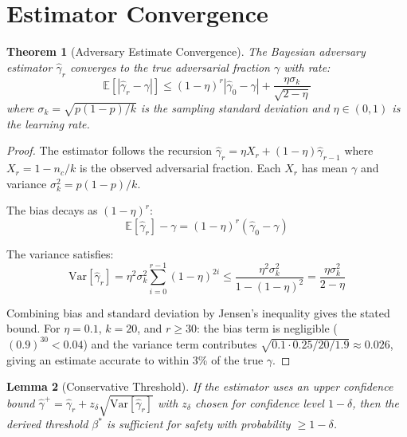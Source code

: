 \documentclass[11pt,a4paper]{article}
\newtheorem{theorem}{Theorem}[section]
\newtheorem{lemma}[theorem]{Lemma}
\begin{document}
\section{Estimator Convergence}
\label{sec:estimator}

\begin{theorem}[Adversary Estimate Convergence]
\label{thm:estimator}
The Bayesian adversary estimator $\hat{\gamma}_r$ converges to the true adversarial
fraction $\gamma$ with rate:
\[
\mathbb{E}[|\hat{\gamma}_r - \gamma|] \leq (1 - \eta)^r |\hat{\gamma}_0 - \gamma| + \frac{\eta \sigma_k}{\sqrt{2 - \eta}}
\]
where $\sigma_k = \sqrt{p(1-p)/k}$ is the sampling standard deviation and $\eta \in (0, 1)$
is the learning rate.
\end{theorem}

\begin{proof}
The estimator follows the recursion $\hat{\gamma}_r = \eta X_r + (1 - \eta)\hat{\gamma}_{r-1}$
where $X_r = 1 - n_c/k$ is the observed adversarial fraction. Each $X_r$ has mean $\gamma$
and variance $\sigma_k^2 = p(1-p)/k$.

The bias decays as $(1-\eta)^r$:
\[
\mathbb{E}[\hat{\gamma}_r] - \gamma = (1-\eta)^r(\hat{\gamma}_0 - \gamma)
\]

The variance satisfies:
\[
\text{Var}[\hat{\gamma}_r] = \eta^2 \sigma_k^2 \sum_{i=0}^{r-1} (1-\eta)^{2i}
\leq \frac{\eta^2 \sigma_k^2}{1 - (1-\eta)^2} = \frac{\eta \sigma_k^2}{2 - \eta}
\]

Combining bias and standard deviation by Jensen's inequality gives the stated bound.
For $\eta = 0.1$, $k = 20$, and $r \geq 30$: the bias term is negligible
($(0.9)^{30} < 0.04$) and the variance term contributes $\sqrt{0.1 \cdot 0.25/20 / 1.9} \approx 0.026$,
giving an estimate accurate to within 3\% of the true $\gamma$.
\end{proof}

\begin{lemma}[Conservative Threshold]
\label{lem:conservative}
If the estimator uses an upper confidence bound $\hat{\gamma}^+ = \hat{\gamma}_r + z_{\delta} \sqrt{\text{Var}[\hat{\gamma}_r]}$
with $z_\delta$ chosen for confidence level $1 - \delta$, then the derived threshold
$\beta^*$ is sufficient for safety with probability $\geq 1 - \delta$.
\end{lemma}
\end{document}
